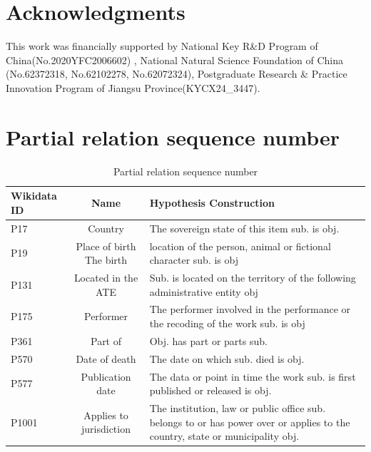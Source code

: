 \documentclass[preprint,12pt]{elsarticle}
\begin{document}
\section*{Acknowledgments}
This work was financially supported by National Key R\&D Program of China(No.2020YFC2006602) , National Natural Science Foundation of China (No.62372318, No.62102278, No.62072324), Postgraduate Research \& Practice Innovation Program of Jiangsu Province(KYCX24\_3447).















%  


\appendix
\begin{table}[h]
\section{Partial relation sequence number}
\caption{Partial relation sequence number}\label{app1}
\begin{tabular*}{\textwidth}{@{\extracolsep\fill}lcp{7cm}}
\toprule%
Wikidata ID & Name & Hypothesis Construction \\
\midrule
P17&	Country	&The sovereign state of this item sub. is obj.\\
P19	&Place of birth	The birth& location of the person, animal or fictional character sub. is obj\\
P131&	Located in the ATE	&Sub. is located on the territory of the following administrative entity obj\\
P175 &Performer&	The performer involved in the performance or the recoding of the work sub. is obj\\
P361&	Part of&	Obj. has part or parts sub.\\
P570&	Date of death&	The date on which sub. died is obj.\\
P577&	Publication date&	The data or point in time the work sub. is first published or released is obj.\\
P1001&	 Applies to jurisdiction&	The institution, law or public office sub. belongs to or has power over or applies to the country, state or municipality obj.\\
\hline
\end{tabular*}
\end{table}
\end{document}
